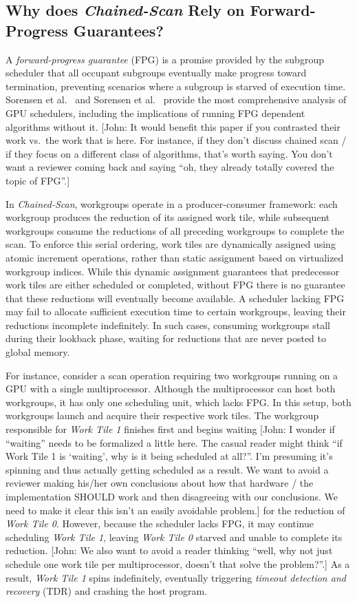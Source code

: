 \documentclass[sigconf]{acmart}
\newcommand{\john}[1]{{\footnotesize\color{cyan}[John: #1]}}
\begin{document}
\subsection{Why does \emph{Chained-Scan} Rely on Forward-Progress Guarantees?}
A \emph{forward-progress guarantee} (FPG) is a promise provided by the subgroup scheduler that all occupant subgroups eventually make progress toward termination, preventing scenarios where a subgroup is starved of execution time. Sorensen et al.~\cite{} and Sorensen et al.~\cite{} provide the most comprehensive analysis of GPU schedulers, including the implications of running FPG dependent algorithms without it. \john{It would benefit this paper if you contrasted their work vs.\ the work that is here. For instance, if they don't discuss chained scan / if they focus on a different class of algorithms, that's worth saying. You don't want a reviewer coming back and saying ``oh, they already totally covered the topic of FPG''\@.}

In \emph{Chained-Scan}, workgroups operate in a producer-consumer framework: each workgroup produces the reduction of its assigned work tile, while subsequent workgroups consume the reductions of all preceding workgroups to complete the scan. To enforce this serial ordering, work tiles are dynamically assigned using atomic increment operations, rather than static assignment based on virtualized workgroup indices. While this dynamic assignment guarantees that predecessor work tiles are either scheduled or completed, without FPG there is no guarantee that these reductions will eventually become available. A scheduler lacking FPG may fail to allocate sufficient execution time to certain workgroups, leaving their reductions incomplete indefinitely. In such cases, consuming workgroups stall during their lookback phase, waiting for reductions that are never posted to global memory.

For instance, consider a scan operation requiring two workgroups running on a GPU with a single multiprocessor. Although the multiprocessor can host both workgroups, it has only one scheduling unit, which lacks FPG\@. In this setup, both workgroups launch and acquire their respective work tiles. The workgroup responsible for \emph{Work Tile 1} finishes first and begins waiting \john{I wonder if ``waiting'' needs to be formalized a little here. The casual reader might think ``if Work Tile 1 is `waiting', why is it being scheduled at all?''. I'm presuming it's spinning and thus actually getting scheduled as a result. We want to avoid a reviewer making his/her own conclusions about how that hardware / the implementation SHOULD work and then disagreeing with our conclusions. We need to make it clear this isn't an easily avoidable problem.} for the reduction of \emph{Work Tile 0}. However, because the scheduler lacks FPG, it may continue scheduling \emph{Work Tile 1}, leaving \emph{Work Tile 0} starved and unable to complete its reduction. \john{We also want to avoid a reader thinking ``well, why not just schedule one work tile per multiprocessor, doesn't that solve the problem?''.} As a result, \emph{Work Tile 1} spins indefinitely, eventually triggering \emph{timeout detection and recovery} (TDR) and crashing the host program.
\end{document}
